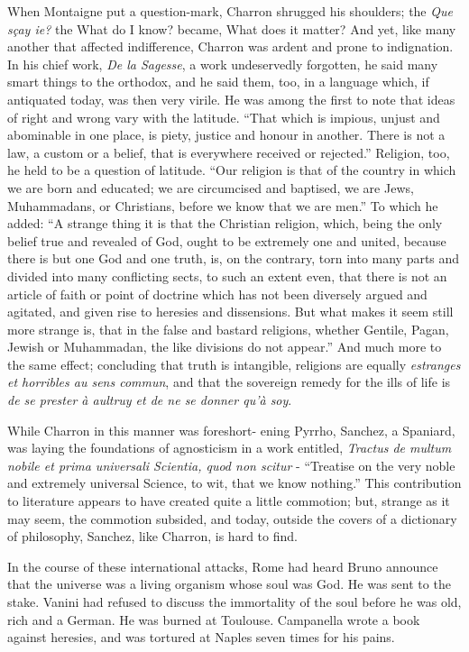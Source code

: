 \documentclass[]{book}
\begin{document}
When Montaigne put a question-mark, Charron shrugged his shoulders; the
\emph{Que sçay ie?} the What do I know? became, What does it matter? And
yet, like many another that affected indifference, Charron was ardent
and prone to indignation. In his chief work, \emph{De la Sagesse}, a
work undeservedly forgotten, he said many smart things to the orthodox,
and he said them, too, in a language which, if antiquated today, was
then very virile. He was among the first to note that ideas of right and
wrong vary with the latitude. ``That which is impious, unjust and
abominable in one place, is piety, justice and honour in another. There
is not a law, a custom or a belief, that is everywhere received or
rejected.'' Religion, too, he held to be a question of latitude. ``Our
religion is that of the country in which we are born and educated; we
are circumcised and baptised, we are Jews, Muhammadans, or Christians,
before we know that we are men.'' To which he added: ``A strange thing
it is that the Christian religion, which, being the only belief true and
revealed of God, ought to be extremely one and united, because there is
but one God and one truth, is, on the contrary, torn into many parts and
divided into many conflicting sects, to such an extent even, that there
is not an article of faith or point of doctrine which has not been
diversely argued and agitated, and given rise to heresies and
dissensions. But what makes it seem still more strange is, that in the
false and bastard religions, whether Gentile, Pagan, Jewish or
Muhammadan, the like divisions do not appear.'' And much more to the
same effect; concluding that truth is intangible, religions are equally
\emph{estranges et horribles au sens commun}, and that the sovereign
remedy for the ills of life is \emph{de se prester à aultruy et de ne se
donner qu'à soy}.

While Charron in this manner was foreshort- ening Pyrrho, Sanchez, a
Spaniard, was laying the foundations of agnosticism in a work entitled,
\emph{Tractus de multum nobile et prima universali Scientia, quod non
scitur} - ``Treatise on the very noble and extremely universal Science,
to wit, that we know nothing.'' This contribution to literature appears
to have created quite a little commotion; but, strange as it may seem,
the commotion subsided, and today, outside the covers of a dictionary of
philosophy, Sanchez, like Charron, is hard to find.

In the course of these international attacks, Rome had heard Bruno
announce that the universe was a living organism whose soul was God. He
was sent to the stake. Vanini had refused to discuss the immortality of
the soul before he was old, rich and a German. He was burned at
Toulouse. Campanella wrote a book against heresies, and was tortured at
Naples seven times for his pains.
\end{document}
